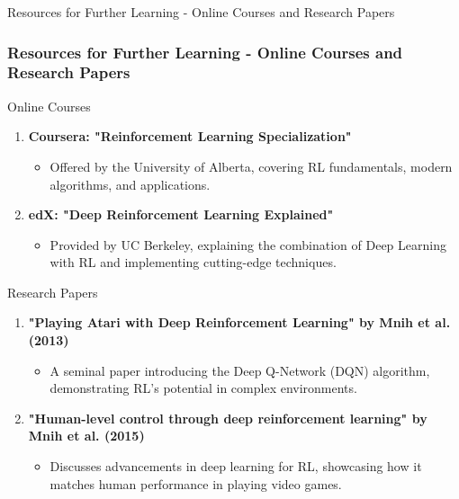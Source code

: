 \documentclass[aspectratio=169]{beamer}
\begin{document}
\begin{frame}[fragile]{Resources for Further Learning - Online Courses and Research Papers}
\frametitle{Resources for Further Learning - Online Courses and Research Papers}
\begin{block}{Online Courses}
    \begin{enumerate}
        \item \textbf{Coursera: "Reinforcement Learning Specialization"} 
        \begin{itemize}
            \item Offered by the University of Alberta, covering RL fundamentals, modern algorithms, and applications.
        \end{itemize}
        
        \item \textbf{edX: "Deep Reinforcement Learning Explained"} 
        \begin{itemize}
            \item Provided by UC Berkeley, explaining the combination of Deep Learning with RL and implementing cutting-edge techniques.
        \end{itemize}
    \end{enumerate}
\end{block}

\begin{block}{Research Papers}
    \begin{enumerate}
        \item \textbf{"Playing Atari with Deep Reinforcement Learning" by Mnih et al. (2013)}
        \begin{itemize}
            \item A seminal paper introducing the Deep Q-Network (DQN) algorithm, demonstrating RL's potential in complex environments.
        \end{itemize}

        \item \textbf{"Human-level control through deep reinforcement learning" by Mnih et al. (2015)}
        \begin{itemize}
            \item Discusses advancements in deep learning for RL, showcasing how it matches human performance in playing video games.
        \end{itemize}
    \end{enumerate}
\end{block}
\end{frame}
\end{document}

